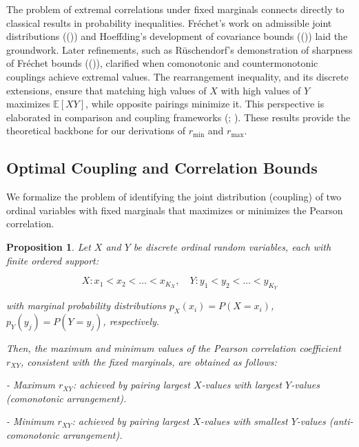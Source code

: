 \documentclass[
  12pt,
]{article}
\theoremstyle{plain}
\newtheorem{proposition}[theorem]{Proposition}
\theoremstyle{definition}
\theoremstyle{remark}
\begin{document}
The problem of extremal correlations under fixed marginals connects
directly to classical results in probability inequalities. Fréchet's
work on admissible joint distributions
(()) and Hoeffding's
development of covariance bounds
(()) laid the
groundwork. Later refinements, such as Rüschendorf's demonstration of
sharpness of Fréchet bounds
(()), clarified when
comonotonic and countermonotonic couplings achieve extremal values. The
rearrangement inequality, and its discrete extensions, ensure that
matching high values of \(X\) with high values of \(Y\) maximizes
\(\mathbb{E}[XY]\), while opposite pairings minimize it. This
perspective is elaborated in comparison and coupling frameworks
(;
). These results provide
the theoretical backbone for our derivations of \(r_{\min}\) and
\(r_{\max}\).

\subsection{Optimal Coupling and Correlation
Bounds}\label{optimal-coupling-and-correlation-bounds}

We formalize the problem of identifying the joint distribution
(coupling) of two ordinal variables with fixed marginals that maximizes
or minimizes the Pearson correlation.

\label{prop-max-product}
\begin{proposition}

Let $X$ and $Y$ be discrete ordinal random variables, each with finite ordered support:

$$
X: x_1 < x_2 < \dots < x_{K_X},\quad Y: y_1 < y_2 < \dots < y_{K_Y}
$$

with marginal probability distributions $p_X(x_i) = P(X = x_i)$, $p_Y(y_j) = P(Y = y_j)$, respectively.

Then, the maximum and minimum values of the Pearson correlation coefficient $r_{XY}$, consistent with the fixed marginals, are obtained as follows:

- Maximum $r_{XY}$: achieved by pairing largest $X$-values with largest $Y$-values (comonotonic arrangement).
    
- Minimum $r_{XY}$: achieved by pairing largest $X$-values with smallest $Y$-values (anti-comonotonic arrangement).
\end{proposition}
\end{document}
